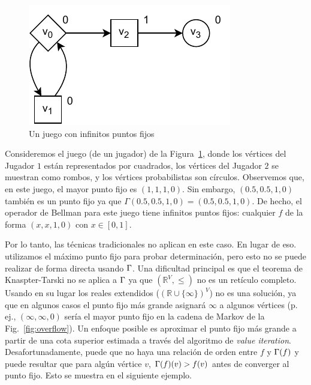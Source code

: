 \begin{figure}
\centering
\includegraphics[scale=0.6]{Figs/inf-fixpoints-horiz.pdf}\hspace{-2ex}
\caption{Un juego con infinitos puntos fijos} \label{fig:multiple-fixpoints}
\end{figure}
\begin{example}\label{ex:several-fixpoints} Consideremos el juego (de un jugador) de la Figura~\ref{fig:multiple-fixpoints}, donde los vértices del Jugador $1$ están representados por cuadrados, los vértices del Jugador $2$ se muestran como rombos, y los vértices probabilistas son círculos. Observemos que, en este juego, el mayor punto fijo es $(1,1,1,0)$.  Sin embargo, $(0.5,0.5,1,0)$ también es un punto fijo ya que $\Gamma(0.5,0.5,1,0) = (0.5,0.5,1,0)$.  De hecho, el operador de Bellman para este juego tiene infinitos puntos fijos: cualquier $f$ de la forma $(x,x,1,0)$ con $x\in[0,1]$.
\end{example}

Por lo tanto, las técnicas tradicionales no aplican en este caso. En lugar de eso. utilizamos el máximo punto fijo para probar determinación, pero esto no se puede realizar de forma directa usando $\Gamma$. Una dificultad principal es que el teorema de Knaspter-Tarski no se aplica a $\Gamma$ ya que $(\mathbb{R}^V, \leq)$ no es un retículo completo. Usando en su lugar los reales extendidos ($(\mathbb{R} \cup \{\infty\})^V$) no es una solución, ya que en algunos casos el punto fijo más grande asignará $\infty$ a algunos vértices (p. ej., $(\infty,\infty,0)$ sería el mayor punto fijo en la cadena de Markov de la Fig.~\ref{fig:overflow}).
Un enfoque posible es aproximar el punto fijo más grande a partir de una cota superior estimada a través del algoritmo de \emph{value iteration}. Desafortunadamente, puede que no haya una relación de orden entre $f$ y $\Gamma(f)$ y puede resultar que para algún vértice $v$, $\Gamma(f)(v)>f(v)$ antes de converger al punto fijo. Esto se muestra en el siguiente ejemplo.

